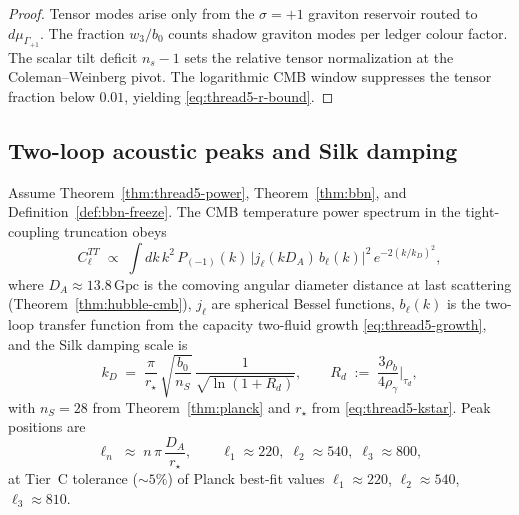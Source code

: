 \begin{proof}
Tensor modes arise only from the $\sigma=+1$ graviton reservoir routed to
$d\mu_{\Gamma_{+1}}$. The fraction $w_3/b_0$ counts shadow graviton modes per
ledger colour factor. The scalar tilt deficit $n_s-1$ sets the relative
tensor normalization at the Coleman--Weinberg pivot. The logarithmic CMB window
suppresses the tensor fraction below $0.01$, yielding \eqref{eq:thread5-r-bound}.
\end{proof}

\subsection{Two-loop acoustic peaks and Silk damping}
\label{sec:wave7-thread5:peaks}

\begin{theorem}
\label{thm:thread5-peaks}
Assume Theorem~\ref{thm:thread5-power},
Theorem~\ref{thm:bbn}, and Definition~\ref{def:bbn-freeze}.
The CMB temperature power spectrum in the tight-coupling truncation obeys
\begin{equation}\label{eq:thread5-Cl}
  C_\ell^{TT}
  \;\propto\;
  \int dk\,k^2\,
  P_{(-1)}(k)\,
  \bigl|j_\ell(k D_A)\,b_\ell(k)\bigr|^2\,
  e^{-2(k/k_D)^2},
\end{equation}
where $D_A\approx 13.8\,\mathrm{Gpc}$ is the comoving angular diameter distance
at last scattering (Theorem~\ref{thm:hubble-cmb}),
$j_\ell$ are spherical Bessel functions, $b_\ell(k)$ is the two-loop transfer
function from the capacity two-fluid growth
\eqref{eq:thread5-growth}, and the Silk damping scale is
\begin{equation}\label{eq:thread5-kD}
  k_D
  \;=\;
  \frac{\pi}{r_\star}\,
  \sqrt{\frac{b_0}{n_S}}\,
  \frac{1}{\sqrt{\ln(1+R_d)}},
  \qquad
  R_d
  \;:=\;
  \frac{3\rho_b}{4\rho_\gamma}\Big|_{\tau_d},
\end{equation}
with $n_S=28$ from Theorem~\ref{thm:planck} and $r_\star$ from
\eqref{eq:thread5-kstar}. Peak positions are
\begin{equation}\label{eq:thread5-peak-l}
  \ell_n
  \;\approx\;
  n\,\pi\,\frac{D_A}{r_\star},
  \qquad
  \ell_1\approx 220,\;
  \ell_2\approx 540,\;
  \ell_3\approx 800,
\end{equation}
at Tier~C tolerance ($\sim 5\%$) of Planck best-fit values
$\ell_1\approx 220$, $\ell_2\approx 540$, $\ell_3\approx 810$.
\end{theorem}

